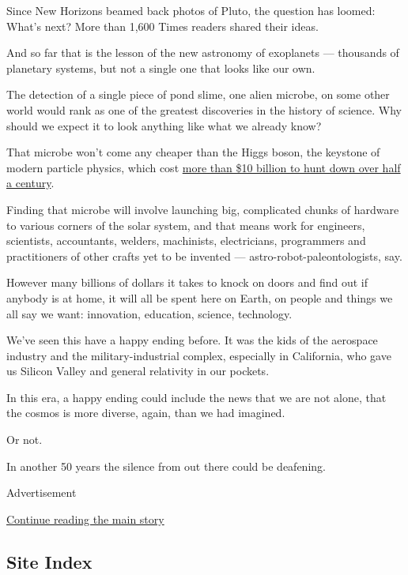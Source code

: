 Since New Horizons beamed back photos of Pluto, the question has loomed:
What's next? More than 1,600 Times readers shared their ideas.

And so far that is the lesson of the new astronomy of exoplanets ---
thousands of planetary systems, but not a single one that looks like our
own.

The detection of a single piece of pond slime, one alien microbe, on
some other world would rank as one of the greatest discoveries in the
history of science. Why should we expect it to look anything like what
we already know?

That microbe won't come any cheaper than the Higgs boson, the keystone
of modern particle physics, which cost
\href{http://www.nytimes3xbfgragh.onion/2013/03/05/science/chasing-the-higgs-boson-how-2-teams-of-rivals-at-CERN-searched-for-physics-most-elusive-particle.html}{more
than \$10 billion to hunt down over half a century}.

Finding that microbe will involve launching big, complicated chunks of
hardware to various corners of the solar system, and that means work for
engineers, scientists, accountants, welders, machinists, electricians,
programmers and practitioners of other crafts yet to be invented ---
astro-robot-paleontologists, say.

However many billions of dollars it takes to knock on doors and find out
if anybody is at home, it will all be spent here on Earth, on people and
things we all say we want: innovation, education, science, technology.

We've seen this have a happy ending before. It was the kids of the
aerospace industry and the military-industrial complex, especially in
California, who gave us Silicon Valley and general relativity in our
pockets.

In this era, a happy ending could include the news that we are not
alone, that the cosmos is more diverse, again, than we had imagined.

Or not.

In another 50 years the silence from out there could be deafening.

Advertisement

\protect\hyperlink{after-bottom}{Continue reading the main story}

\hypertarget{site-index}{%
\subsection{Site Index}\label{site-index}}

